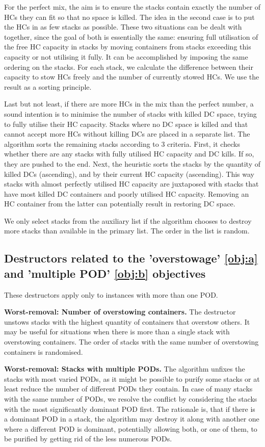\documentclass[preprint,12pt,3p]{elsarticle}
\begin{document}
For the perfect mix, the aim is to ensure the stacks contain exactly the number of HCs they can fit so that no space is killed. The idea in the second case is to put the HCs in as few stacks as possible. These two situations can be dealt with together, since the goal of both is essentially the same: ensuring full utilisation of the free HC capacity in stacks by moving containers from stacks exceeding this capacity or not utilising it fully. It can be accomplished by imposing the same ordering on the stacks. For each stack, we calculate the difference between their capacity to stow HCs freely and the number of currently stowed HCs. We use the result as a sorting principle. 

Last but not least, if there are more HCs in the mix than the perfect number, a sound intention is to minimise the number of stacks with killed DC space, trying to fully utilise their HC capacity. Stacks where no DC space is killed and that cannot accept more HCs without killing DCs are placed in a separate list. The algorithm sorts the remaining stacks according to 3 criteria. First, it checks whether there are any stacks with fully utilised HC capacity and DC kills. If so, they are pushed to the end. Next, the heuristic sorts the stacks by the quantity of killed DCs (ascending), and by their current HC capacity (ascending). This way stacks with almost perfectly utilised HC capacity are juxtaposed with stacks that have most killed DC containers and poorly utilised HC capacity. Removing an HC container from the latter can potentially result in restoring DC space. 

We only select stacks from the auxiliary list if the algorithm chooses to destroy more stacks than available in the primary list. The order in the list is random.

\subsection{Destructors related to the 'overstowage' \ref{obj:a} and 'multiple POD' \ref{obj:b} objectives}
These destructors apply only to instances with more than one POD.

\textbf{Worst-removal: Number of overstowing containers.} The destructor unstows stacks with the highest quantity of containers that overstow others. It may be useful for situations when there is more than a single stack with overstowing containers. The order of stacks with the same number of overstowing containers is randomised.

\textbf{Worst-removal: Stacks with multiple PODs.} The algorithm unfixes the stacks with most varied PODs, as it might be possible to purify some stacks or at least reduce the number of different PODs they contain. In case of many stacks with the same number of PODs, we resolve the conflict by considering the stacks with the most significantly dominant POD first. The rationale is, that if there is a dominant POD in a stack, the algorithm may destroy it along with another one where a different POD is dominant, potentially allowing both, or one of them, to be purified by getting rid of the less numerous PODs.
\end{document}
